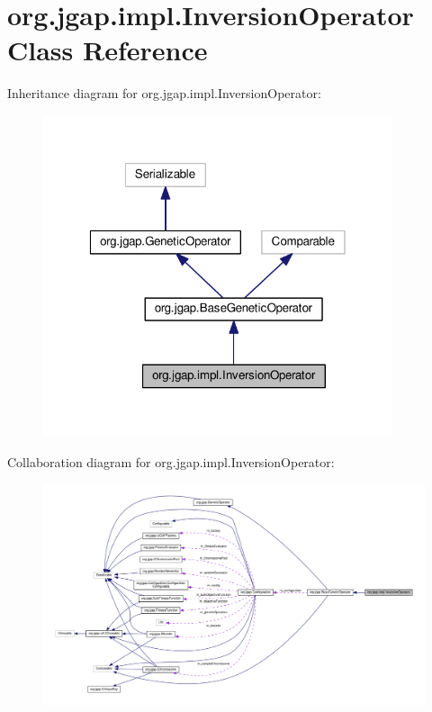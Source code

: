 \hypertarget{classorg_1_1jgap_1_1impl_1_1_inversion_operator}{\section{org.\-jgap.\-impl.\-Inversion\-Operator Class Reference}
\label{classorg_1_1jgap_1_1impl_1_1_inversion_operator}
}


Inheritance diagram for org.\-jgap.\-impl.\-Inversion\-Operator\-:
\nopagebreak
\begin{figure}[H]
\begin{center}
\leavevmode
\includegraphics[width=291pt]{classorg_1_1jgap_1_1impl_1_1_inversion_operator__inherit__graph}
\end{center}
\end{figure}


Collaboration diagram for org.\-jgap.\-impl.\-Inversion\-Operator\-:
\nopagebreak
\begin{figure}[H]
\begin{center}
\leavevmode
\includegraphics[width=350pt]{classorg_1_1jgap_1_1impl_1_1_inversion_operator__coll__graph}
\end{center}
\end{figure}
